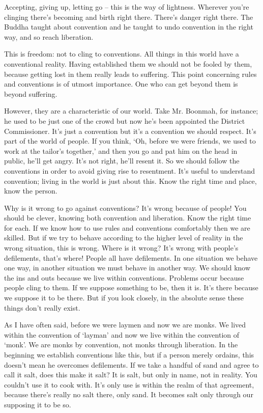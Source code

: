 Accepting, giving up, letting go -- this is the way of lightness. Wherever you're clinging there's becoming and birth right there. There's danger right there. The Buddha taught about convention and he taught to undo convention in the right way, and so reach liberation. 

This is freedom: not to cling to conventions. All things in this world have a conventional reality. Having established them we should not be fooled by them, because getting lost in them really leads to suffering. This point concerning rules and conventions is of utmost importance. One who can get beyond them is beyond suffering. 

However, they are a characteristic of our world. Take Mr. Boonmah, for instance; he used to be just one of the crowd but now he's been appointed the District Commissioner. It's just a convention but it's a convention we should respect. It's part of the world of people. If you think, `Oh, before we were friends, we used to work at the tailor's together,' and then you go and pat him on the head in public, he'll get angry. It's not right, he'll resent it. So we should follow the conventions in order to avoid giving rise to resentment. It's useful to understand convention; living in the world is just about this. Know the right time and place, know the person. 

Why is it wrong to go against conventions? It's wrong because of people! You should be clever, knowing both convention and liberation. Know the right time for each. If we know how to use rules and conventions comfortably then we are skilled. But if we try to behave according to the higher level of reality in the wrong situation, this is wrong. Where is it wrong? It's wrong with people's defilements, that's where! People all have defilements. In one situation we behave one way, in another situation we must behave in another way. We should know the ins and outs because we live within conventions. Problems occur because people cling to them. If we suppose something to be, then it is. It's there because we suppose it to be there. But if you look closely, in the absolute sense these things don't really exist. 

As I have often said, before we were laymen and now we are monks. We lived within the convention of `layman' and now we live within the convention of `monk'. We are monks by convention, not monks through liberation. In the beginning we establish conventions like this, but if a person merely ordains, this doesn't mean he overcomes defilements. If we take a handful of sand and agree to call it salt, does this make it salt? It is salt, but only in name, not in reality. You couldn't use it to cook with. It's only use is within the realm of that agreement, because there's really no salt there, only sand. It becomes salt only through our supposing it to be so.


